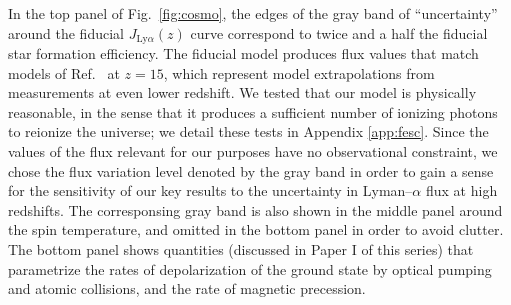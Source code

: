 In the top panel of Fig.~\ref{fig:cosmo}, the edges of the gray band of ``uncertainty'' around the fiducial $J_{\text{Ly}\alpha}(z)$ curve correspond to twice and a half the fiducial star formation efficiency. The fiducial model produces flux values that match models of Ref.~\cite{2012ApJ...746..125H} at $z=15$, which represent model extrapolations from measurements at even lower redshift. We tested that our model is physically reasonable, in the sense that it produces a sufficient number of ionizing photons to reionize the universe; we detail these tests in Appendix \ref{app:fesc}. Since the values of the flux relevant for our purposes have no observational constraint, we chose the flux variation level denoted by the gray band in order to gain a sense for the sensitivity of our key results to the uncertainty in Lyman--$\alpha$ flux at high redshifts. The corresponsing gray band is also shown in the middle panel around the spin temperature, and omitted in the bottom panel in order to avoid clutter. The bottom panel shows quantities (discussed in Paper I of this series) that parametrize the rates of depolarization of the ground state by optical pumping and atomic collisions, and the rate of magnetic precession. 

